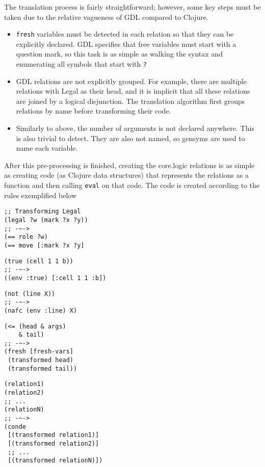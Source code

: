 \documentclass[letterpaper]{article}
\begin{document}
The translation process is fairly straightforward; however, some key steps must be taken due to the relative vagueness of GDL compared to Clojure.
\begin{itemize}
\item \texttt{fresh} variables must be detected in each relation so that they can be explicitly declared. GDL specifies that free variables must start with a question mark, so this task is as simple as walking the syntax and enumerating all symbols that start with \texttt{?}
\item GDL relations are not explicitly grouped. For example, there are multiple relations with Legal as their head, and it is implicit that all these relations are joined by a logical disjunction. The translation algorithm first groups relations by name before transforming their code.
\item Similarly to above, the number of arguments is not declared anywhere. This is also trivial to detect. They are also not named, so gensyms are used to name each variable.
\end{itemize}

After this pre-processing is finished, creating the core.logic relations is as simple as creating code (as Clojure data structures) that represents the relations as a function and then calling \texttt{eval} on that code. The code is created according to the rules exemplified below
\begin{lstlisting}[frame=single, caption=Reflexive head calls turn into unifications]
;; Transforming Legal
(legal ?w (mark ?x ?y))
;; -~->
(== role ?w)
(== move [:mark ?x ?y]
\end{lstlisting}

\begin{lstlisting}[frame=single,caption=All other relations reference the environment]
(true (cell 1 1 b))
;; -~->
((env :true) [:cell 1 1 :b])
\end{lstlisting}

\begin{lstlisting}[frame=single,caption=not turns into negation as failure constraint (nafc)]
(not (line X))
;; -~->
(nafc (env :line) X)
\end{lstlisting}

\begin{lstlisting}[frame=single,caption=TODO]
(<= (head & args)
    & tail)
;; -~->
(fresh [fresh-vars]
 (transformed head)
 (transformed tail))
\end{lstlisting}

\begin{lstlisting}[frame=single,caption=TODO]
(relation1)
(relation2)
;; ...
(relationN)
;; -~->
(conde
 [(transformed relation1)]
 [(transformed relation2)]
 ;; ...
 [(transformed relationN)])
\end{lstlisting} 
\end{document}
